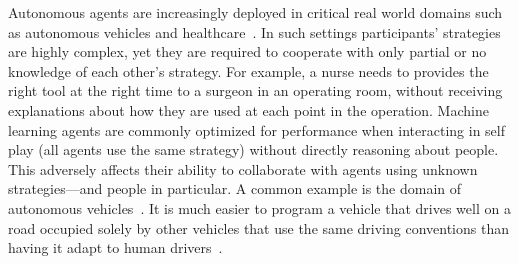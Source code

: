 \documentclass[letterpaper]{article} %
\begin{document}
  Autonomous agents are increasingly deployed  in critical real world domains such as  autonomous vehicles and healthcare~\cite{navarro2017machine,wiens}.
  In such settings   participants' strategies are highly complex, yet they are required to cooperate with only partial or no knowledge of each other's strategy.  For example, a nurse  needs to provides the right tool at the right time  to a surgeon in an operating room, without receiving  explanations about how they are used at each point in the operation.
   Machine learning agents are commonly optimized for performance when interacting in self play (all agents use the same strategy) without directly reasoning about  people.
   This adversely affects their ability to collaborate with agents using unknown strategies---and people in particular.
   A common example is the domain of  autonomous vehicles~\cite{nunes2018people}. It is much easier to program a vehicle that drives well on a road occupied solely by other vehicles that use the same driving conventions than having it adapt to human drivers~\cite{dresner2007sharing}.



\end{document}
